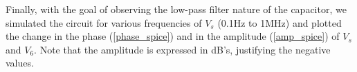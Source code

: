 Finally, with the goal of observing the low-pass filter nature 
of the capacitor, we simulated the circuit for various frequencies of 
$V_s$ (0.1Hz to 1MHz) and plotted the change in the phase (\ref{phase_spice}) 
and in the amplitude (\ref{amp_spice}) of $V_s$ and $V_6$. Note that the 
amplitude is expressed in dB's, justifying the negative values.











